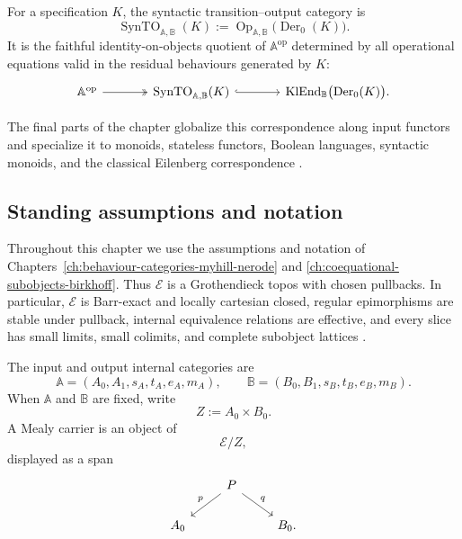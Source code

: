 For a specification \(K\), the syntactic transition--output category is
\[
    \operatorname{SynTO}_{\mathbb A,\mathbb B}(K)
    :=
    \operatorname{Op}_{\mathbb A,\mathbb B}
    \bigl(\operatorname{Der}_0(K)\bigr).
\]
It is the faithful identity-on-objects quotient of
\(\mathbb A^{\mathrm{op}}\) determined by all operational equations valid in
the residual behaviours generated by \(K\):
\[
\begin{tikzcd}[column sep=large]
    \mathbb A^{\mathrm{op}}
        \arrow[r, two heads]
    &
    \operatorname{SynTO}_{\mathbb A,\mathbb B}(K)
        \arrow[r, hook]
    &
    \operatorname{KlEnd}_{\mathbb B}
    \bigl(\operatorname{Der}_0(K)\bigr).
\end{tikzcd}
\]

The final parts of the chapter globalize this correspondence along input
functors and specialize it to monoids, stateless functors, Boolean languages,
syntactic monoids, and the classical Eilenberg correspondence
\cite{Eilenberg1974,AdamekMiliusMyersUrbat2019TOCL,Salamanca2017Unveiling}.

\subsection{Standing assumptions and notation}
\label{subsec:syntactic-to-standing-assumptions}

Throughout this chapter we use the assumptions and notation of
Chapters~\ref{ch:behaviour-categories-myhill-nerode} and
\ref{ch:coequational-subobjects-birkhoff}. Thus \(\mathcal E\) is a
Grothendieck topos with chosen pullbacks. In particular, \(\mathcal E\) is
Barr-exact and locally cartesian closed, regular epimorphisms are stable under
pullback, internal equivalence relations are effective, and every slice has
small limits, small colimits, and complete subobject lattices
\cite{Johnstone2002,Borceux1994,Jacobs1999CategoricalLogic}.

The input and output internal categories are
\[
    \mathbb A=(A_0,A_1,s_A,t_A,e_A,m_A),
    \qquad
    \mathbb B=(B_0,B_1,s_B,t_B,e_B,m_B).
\]
When \(\mathbb A\) and \(\mathbb B\) are fixed, write
\[
    Z:=A_0\times B_0.
\]
A Mealy carrier is an object of
\[
    \mathcal E/Z,
\]
displayed as a span
\[
\begin{tikzcd}
    &
    P
        \arrow[dl, "p"']
        \arrow[dr, "q"]
    &
    \\
    A_0
    &&
    B_0.
\end{tikzcd}
\]

